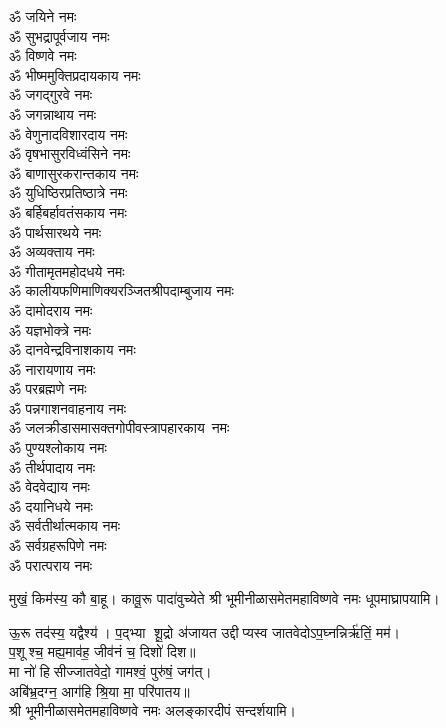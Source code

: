 \begin{center}
\begin{multicols}{2}
\begin{flushleft}
ॐ जयिने नमः\hfill{}\\
ॐ सुभद्रापूर्वजाय नमः\\
ॐ विष्णवे नमः\\
ॐ भीष्ममुक्तिप्रदायकाय नमः\\
ॐ जगद्गुरवे नमः\\
ॐ जगन्नाथाय नमः\\
ॐ वेणुनादविशारदाय नमः\\
ॐ वृषभासुरविध्वंसिने नमः\\
ॐ बाणासुरकरान्तकाय नमः\\
ॐ युधिष्ठिरप्रतिष्ठात्रे नमः\\
ॐ बर्हिबर्हावतंसकाय नमः\hfill{}\\
ॐ पार्थसारथये नमः\\
ॐ अव्यक्ताय नमः\\
ॐ गीतामृतमहोदधये नमः\\
ॐ कालीयफणिमाणिक्य\-रञ्जित\-श्री\-पदाम्बुजाय नमः\\
ॐ दामोदराय नमः\\
ॐ यज्ञभोक्त्रे नमः\\
ॐ दानवेन्द्रविनाशकाय नमः\\
ॐ नारायणाय नमः\\
ॐ परब्रह्मणे नमः\\
ॐ पन्नगाशनवाहनाय नमः\hfill{}\\
ॐ जलक्रीडासमासक्त\-गोपी\-वस्त्रापहारकाय~नमः\\
ॐ पुण्यश्लोकाय नमः\\
ॐ तीर्थपादाय नमः\\
ॐ वेदवेद्याय नमः\\
ॐ दयानिधये नमः\\
ॐ सर्वतीर्थात्मकाय नमः\\
ॐ सर्वग्रहरूपिणे नमः\\
ॐ परात्पराय नमः\hfill{}\\
\end{flushleft}
\end{multicols}

  
{मुखं॒ किम॑स्य॒ कौ बा॒हू। कावू॒रू पादा॑वुच्येते}
श्री भूमीनीळासमेतमहाविष्णवे नमः धूपमाघ्रापयामि।\medskip
 
{ऊ॒रू तद॑स्य॒ यद्वैश्य॑। प॒द्भ्या शू॒द्रो अ॑जायत}
उद्दीप्यस्व जातवेदोऽप॒घ्नन्निर्ऋ॑तिं॒ मम॑।\\
 प॒शूश्च॒ मह्य॒माव॑ह॒ जीव॑नं च॒ दिशो॑ दिश॥ \\
मा नो॑ हिसीज्जातवेदो॒ गामश्वं॒ पुरु॑षं॒ जग॑त्।\\
अबि॑भ्र॒दग्न॒ आग॑हि श्रि॒या मा॒ परि॑पातय॥ \\
श्री भूमीनीळासमेतमहाविष्णवे नमः अलङ्कारदीपं सन्दर्शयामि।\medskip


\end{center}
